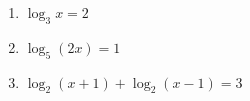 \documentclass[12pt, twoside]{article}
\begin{document}
\begin{enumerate}[itemsep=0.25cm]
\begin{enumerate}[label=(\alph*), itemsep=1cm]
  \item $\log_3 x = 2$
  \vspace{1.6cm}

  \item $\log_5(2x) = 1$
  \vspace{1.6cm}

  \item $\log_2(x+1) + \log_2(x-1) = 3$
  \vspace{1.6cm}
\end{enumerate}

\end{enumerate}
\end{document}
